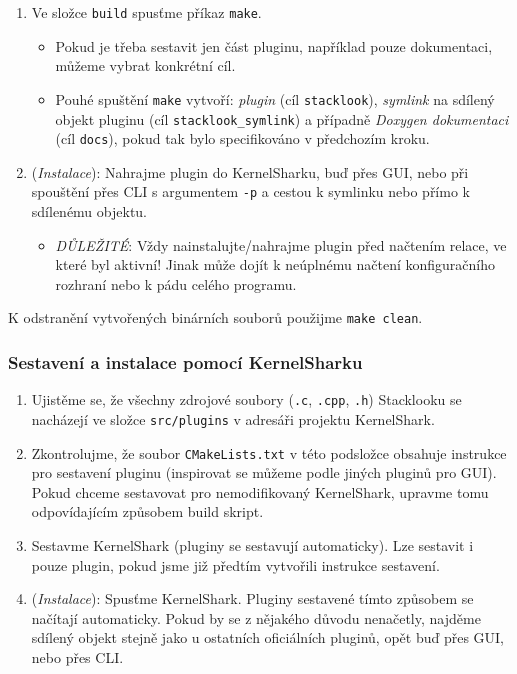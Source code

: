 \begin{enumerate}
\begin{itemize}
    \end{itemize}
  \item Ve složce \texttt{build} spusťme příkaz \texttt{make}.
    \begin{itemize}
      \item Pokud je třeba sestavit jen část pluginu, například pouze dokumentaci, můžeme vybrat konkrétní cíl.
      \item Pouhé spuštění \texttt{make} vytvoří: \emph{plugin} (cíl \texttt{stacklook}), \emph{symlink} na sdílený objekt pluginu (cíl \texttt{stacklook\_symlink}) a případně \emph{Doxygen dokumentaci} (cíl \texttt{docs}), pokud tak bylo specifikováno v předchozím kroku.
    \end{itemize}
  \item (\emph{Instalace}): Nahrajme plugin do KernelSharku, buď přes GUI, nebo při spouštění přes CLI s argumentem \texttt{-p} a cestou k symlinku nebo přímo k sdílenému objektu.
    \begin{itemize}
      \item \emph{DŮLEŽITÉ}: Vždy nainstalujte/nahrajme plugin před načtením relace, ve které byl aktivní! Jinak může dojít k neúplnému načtení konfiguračního rozhraní nebo k pádu celého programu.
    \end{itemize}
\end{enumerate}

K odstranění vytvořených binárních souborů použijme \texttt{make clean}.

\subsubsection{Sestavení a instalace pomocí KernelSharku}

\begin{enumerate}
  \item Ujistěme se, že všechny zdrojové soubory (\texttt{.c}, \texttt{.cpp}, \texttt{.h}) Stacklooku se nacházejí ve složce \texttt{src/plugins} v adresáři projektu KernelShark.
  \item Zkontrolujme, že soubor \texttt{CMakeLists.txt} v této podsložce obsahuje instrukce pro sestavení pluginu (inspirovat se můžeme podle jiných pluginů pro GUI). Pokud chceme sestavovat pro nemodifikovaný KernelShark, upravme tomu odpovídajícím způsobem build skript.
  \item Sestavme KernelShark (pluginy se sestavují automaticky). Lze sestavit i pouze plugin, pokud jsme již předtím vytvořili instrukce sestavení.
  \item (\emph{Instalace}): Spusťme KernelShark. Pluginy sestavené tímto způsobem se načítají automaticky. Pokud by se z nějakého důvodu nenačetly, najděme sdílený objekt stejně jako u ostatních oficiálních pluginů, opět buď přes GUI, nebo přes CLI.
\end{enumerate}

